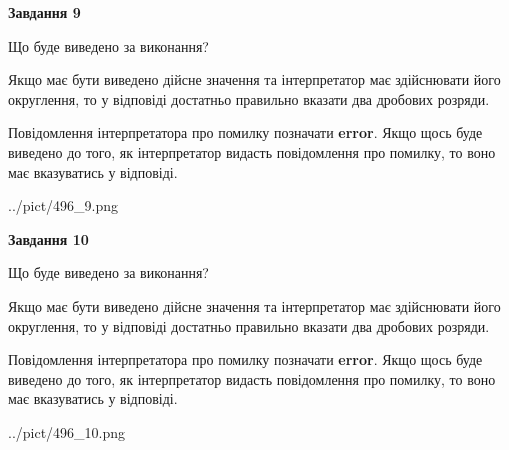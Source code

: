 \documentclass[12pt, ukrainian]{article}
\begin{document}
{\begin {Large}
{\begin {center}\textbf{Завдання 9}\end {center}}\par
Що буде виведено за виконання? \par

Якщо має бути виведено дійсне значення та інтерпретатор має здійснювати його округлення, 
то у відповіді достатньо правильно вказати два дробових розряди.

Повідомлення інтерпретатора про помилку позначати \textbf{error}.
Якщо щось буде виведено до того, як інтерпретатор видасть повідомлення про помилку, 
то воно має вказуватись у відповіді. \par

\begin{center}
	{../pict/496_9.png}
\end{center}
\newpage

{\begin {center}\textbf{Завдання 10}\end {center}}\par
Що буде виведено за виконання? \par

Якщо має бути виведено дійсне значення та інтерпретатор має здійснювати його округлення, 
то у відповіді достатньо правильно вказати два дробових розряди.

Повідомлення інтерпретатора про помилку позначати \textbf{error}.
Якщо щось буде виведено до того, як інтерпретатор видасть повідомлення про помилку, 
то воно має вказуватись у відповіді. \par

\begin{center}
	{../pict/496_10.png}
\end{center}
\newpage

\end {Large}}
\end{document}
